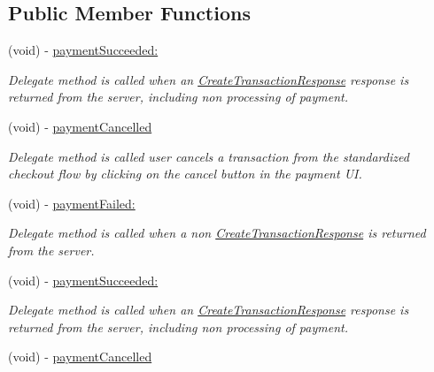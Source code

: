 \subsection*{Public Member Functions}
\begin{DoxyCompactItemize}
\item 
\hypertarget{protocol_auth_net_delegate-p_a83216768724bb11ffb35836d1c26b3a9}{
(void) -\/ \hyperlink{protocol_auth_net_delegate-p_a83216768724bb11ffb35836d1c26b3a9}{paymentSucceeded:}}
\label{protocol_auth_net_delegate-p_a83216768724bb11ffb35836d1c26b3a9}

\begin{DoxyCompactList}\small\item\em Delegate method is called when an \hyperlink{interface_create_transaction_response}{CreateTransactionResponse} response is returned from the server, including non processing of payment. \item\end{DoxyCompactList}\item 
\hypertarget{protocol_auth_net_delegate-p_a85de6c31d6fd6190b54f66b33cd2c7b0}{
(void) -\/ \hyperlink{protocol_auth_net_delegate-p_a85de6c31d6fd6190b54f66b33cd2c7b0}{paymentCancelled}}
\label{protocol_auth_net_delegate-p_a85de6c31d6fd6190b54f66b33cd2c7b0}

\begin{DoxyCompactList}\small\item\em Delegate method is called user cancels a transaction from the standardized checkout flow by clicking on the cancel button in the payment UI. \item\end{DoxyCompactList}\item 
(void) -\/ \hyperlink{protocol_auth_net_delegate-p_a93b8bf1be8cf23af9c53eadd3e3566b3}{paymentFailed:}
\begin{DoxyCompactList}\small\item\em Delegate method is called when a non \hyperlink{interface_create_transaction_response}{CreateTransactionResponse} is returned from the server. \item\end{DoxyCompactList}\item 
\hypertarget{protocol_auth_net_delegate-p_a83216768724bb11ffb35836d1c26b3a9}{
(void) -\/ \hyperlink{protocol_auth_net_delegate-p_a83216768724bb11ffb35836d1c26b3a9}{paymentSucceeded:}}
\label{protocol_auth_net_delegate-p_a83216768724bb11ffb35836d1c26b3a9}

\begin{DoxyCompactList}\small\item\em Delegate method is called when an \hyperlink{interface_create_transaction_response}{CreateTransactionResponse} response is returned from the server, including non processing of payment. \item\end{DoxyCompactList}\item 
\hypertarget{protocol_auth_net_delegate-p_a85de6c31d6fd6190b54f66b33cd2c7b0}{
(void) -\/ \hyperlink{protocol_auth_net_delegate-p_a85de6c31d6fd6190b54f66b33cd2c7b0}{paymentCancelled}}
\label{protocol_auth_net_delegate-p_a85de6c31d6fd6190b54f66b33cd2c7b0}


\end{DoxyCompactItemize}
